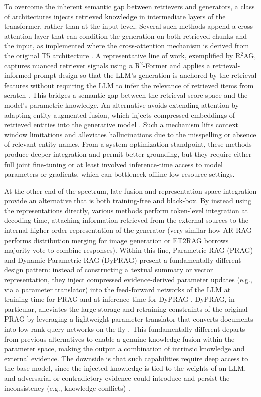 \documentclass[11pt,a4paper]{article}
\begin{document}
To overcome the inherent semantic gap between retrievers and generators, a class of architectures injects retrieved knowledge in intermediate layers of the transformer, rather than at the input level. Several such methods append a cross-attention layer that can condition the generation on both retrieved chunks and the input, as implemented where the cross-attention mechanism is derived from the original T5 architecture \cite{arxiv:2005.11401v4}. A representative line of work, exemplified by R$^{2}$AG, captures nuanced retriever signals using a R$^{2}$-Former and applies a retrieval-informed prompt design so that the LLM's generation is anchored by the retrieval features without requiring the LLM to infer the relevance of retrieved items from scratch \cite{arxiv:2406.13249v1}. This bridges a semantic gap between the retrieval-score space and the model's parametric knowledge. An alternative avoids extending attention by adapting entity-augmented fusion, which injects compressed embeddings of retrieved entities into the generative model \cite{arxiv:2312.08976v2}. Such a mechanism lifts context window limitations and alleviates hallucinations due to the misspelling or absence of relevant entity names. From a system optimization standpoint, these methods produce deeper integration and permit better grounding, but they require either full joint fine-tuning or at least involved inference-time access to model parameters or gradients, which can bottleneck offline low-resource settings.

At the other end of the spectrum, late fusion and representation-space integration provide an alternative that is both training-free and black-box. By instead using the representations directly, various methods perform token-level integration at decoding time, attaching information retrieved from the external sources to the internal higher-order representation of the generator (very similar how AR-RAG performs distribution merging for image generation or ET2RAG borrows majority-vote to combine responses). Within this line, Parametric RAG (PRAG) and Dynamic Parametric RAG (DyPRAG) present a fundamentally different design pattern: instead of constructing a textual summary or vector representation, they inject compressed evidence-derived parameter updates (e.g., via a parameter translator) into the feed-forward networks of the LLM at training time for PRAG and at inference time for DyPRAG \cite{arxiv:2501.15915v1,arxiv:2503.23895v4}. DyPRAG, in particular, alleviates the large storage and retraining constraints of the original PRAG by leveraging a lightweight parameter translator that converts documents into low-rank query-networks on the fly \cite{arxiv:2503.23895v4}. This fundamentally different departs from previous alternatives to enable a genuine knowledge fusion within the parameter space, making the output a combination of intrinsic knowledge and external evidence. The downside is that such capabilities require deep access to the base model, since the injected knowledge is tied to the weights of an LLM, and adversarial or contradictory evidence could introduce and persist the inconsistency (e.g., knowledge conflicts) \cite{arxiv:2508.06401v3,arxiv:2404.19543v1}.
\end{document}
